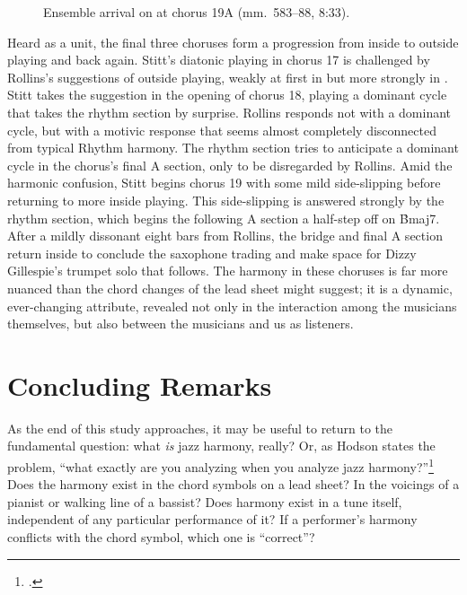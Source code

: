 \begin{figure}[tbp]
  \caption[Ensemble arrival on \protect\h{Bmaj7} at chorus
  \protect{}.]{%
    Ensemble arrival on \protect{} at chorus
    {\protect\ssliningfont19A} (mm.~583--88, 8:33).}
  \label{et:ens-side-slipping}
\end{figure}

Heard as a unit, the final three choruses form a progression from inside to
outside playing and back again. Stitt's diatonic playing in chorus 17 is
challenged by Rollins's suggestions of outside playing, weakly at first in
 but more strongly in . Stitt takes the suggestion in
the opening of chorus 18, playing a dominant cycle that takes the rhythm
section by surprise. Rollins responds not with a dominant cycle, but with a
motivic response that seems almost completely disconnected from typical Rhythm
harmony. The rhythm section tries to anticipate a dominant cycle in the
chorus's final A section, only to be disregarded by Rollins. Amid the harmonic
confusion, Stitt begins chorus 19 with some mild side-slipping before
returning to more inside playing. This side-slipping is answered strongly by
the rhythm section, which begins the following A section a half-step off on
\h{Bmaj7}. After a mildly dissonant eight bars from Rollins, the bridge and
final A section return inside to conclude the saxophone trading and make space
for Dizzy Gillespie's trumpet solo that follows. The harmony in these choruses
is far more nuanced than the chord changes of the lead sheet might suggest; it
is a dynamic, ever-changing attribute, revealed not only in the interaction
among the musicians themselves, but also between the musicians and us as
listeners.

\section{Concluding Remarks}

As the end of this study approaches, it may be useful to return to the
fundamental question: what \emph{is} jazz harmony, really? Or, as Hodson
states the problem, ``what exactly are you analyzing when you analyze jazz
harmony?''\footcite[52]{hodson:2007} Does the harmony exist in the chord
symbols on a lead sheet? In the voicings of a pianist or walking line of a
bassist? Does harmony exist in a tune itself, independent of any particular
performance of it? If a performer's harmony conflicts with the chord symbol,
which one is ``correct''?

